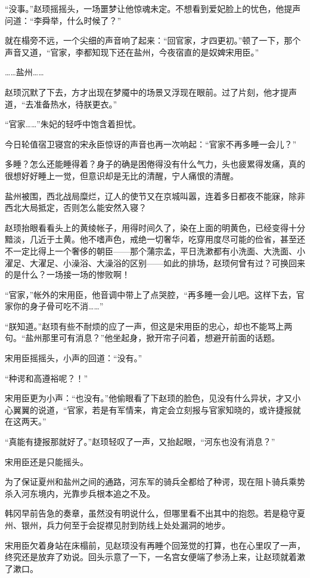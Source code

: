 “没事。”赵顼摇摇头，一场噩梦让他惊魂未定。不想看到爱妃脸上的忧色，他提声问道：“李舜举，什么时候了？”

就在榻旁不远，一个尖细的声音响了起来：“回官家，才四更初。”顿了一下，那个声音又道，“官家，李都知现下还在盐州，今夜宿直的是奴婢宋用臣。”

……盐州……

赵顼沉默了下去，方才出现在梦魇中的场景又浮现在眼前。过了片刻，他才提声道，“去准备热水，待朕更衣。”

“官家……”朱妃的轻呼中饱含着担忧。

今日轮值宿卫寝宫的宋永臣惊讶的声音也再一次响起：“官家不再多睡一会儿？”

多睡？怎么还能睡得着？身子的确是困倦得没有什么气力，头也疲累得发痛，真的很想好好睡上一觉，但意识却是无比的清醒，宁人痛恨的清醒。

盐州被围，西北战局糜烂，辽人的使节又在京城叫嚣，连着多日都夜不能寐，除非西北大局抵定，否则怎么能安然入寝？

赵顼抬眼看看头上的黄绫帐子，用得时间久了，染在上面的明黄色，已经变得十分黯淡，几近于土黄。他不嗜声色，戒绝一切奢华，吃穿用度尽可能的俭省，甚至还不一定比得上一个奢侈的朝臣——那个蒲宗孟，平日洗漱都有小洗面、大洗面、小濯足、大濯足、小澡浴、大澡浴的区别——如此的排场，赵顼何曾有过？可换回来的是什么？一场接一场的惨败啊！

“官家，”帐外的宋用臣，他音调中带上了点哭腔，“再多睡一会儿吧。这样下去，官家你的身子骨可吃不消……”

“朕知道。”赵顼有些不耐烦的应了一声，但这是宋用臣的忠心，却也不能骂上两句。“盐州那里可有消息？”他坐起身，掀开帘子问着，想避开前面的话题。

宋用臣摇摇头，小声的回道：“没有。”

“种谔和高遵裕呢？！”

宋用臣更为小声：“也没有。”他偷眼看了下赵顼的脸色，见没有什么异状，才又小心翼翼的说道，“官家，若是有军情来，肯定会立刻报与官家知晓的，或许捷报就在这两天。”

“真能有捷报那就好了。”赵顼轻叹了一声，又抬起眼，“河东也没有消息？”

宋用臣还是只能摇头。

为了保证夏州和盐州之间的通路，河东军的骑兵全都给了种谔，现在阻卜骑兵乘势杀入河东境内，光靠步兵根本追之不及。

韩冈早前告急的奏章，虽然没有明说什么，但哪里看不出其中的抱怨。若是稳守夏州、银州，兵力何至于会捉襟见肘到防线上处处漏洞的地步。

宋用臣欠着身站在床榻前，见赵顼没有再睡个回笼觉的打算，也在心里叹了一声，终究还是放弃了劝说。回头示意了一下，一名宫女便端了参汤上来，让赵顼就着漱了漱口。

